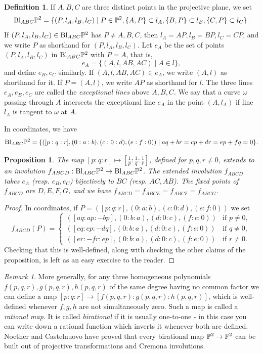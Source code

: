 \documentclass[letterpaper,11pt]{article}
\newtheorem{prop}{Proposition}
\theoremstyle{definition}
\newtheorem{defn}{Definition}
\theoremstyle{remark}
\newtheorem{rmk}{Remark}
\begin{document}
\begin{defn} If $A,B,C$ are three distinct points in the projective plane, we set
\[
\text{\rm Bl}_{ABC}\mathbb{P}^2 = \{(P,l_A,l_B,l_C)\mid P \in \mathbb{P}^2, \{A,P\} \subset l_A, \{B,P\} \subset l_B, \{C,P\} \subset l_C\}.
\]
If $(P,l_A,l_B,l_C) \in \text{\rm Bl}_{ABC}\mathbb{P}^2$ has $P \ne A,B,C$, then $l_A = AP, l_B = BP, l_C = CP$, and we write $P$ as shorthand for $(P,l_A,l_B,l_C)$. Let $e_A$ be the set of points $(P,l_A,l_B,l_C)$ in $\text{\rm Bl}_{ABC}\mathbb{P}^2$ with $P = A$, that is,
\[
e_A = \{(A,l,AB,AC) \mid A\in l\},
\]
and define $e_B, e_C$ similarly. If $(A,l,AB,AC)\in e_A$, we write $(A,l)$ as shorthand for it. If $P = (A,l)$, we write $AP$ as shorthand for $l$. The three lines $e_A, e_B, e_C$ are called the \emph{exceptional lines} above $A,B,C$. We say that a curve $\omega$ passing through $A$ intersects the exceptional line $e_A$ in the point $(A,l_A)$ if line $l_A$ is tangent to $\omega$ at $A$.
\end{defn}

In coordinates, we have
\[
\text{\rm Bl}_{ABC}\mathbb{P}^2 = \{([p:q:r],(0:a:b),(c:0:d),(e:f:0))\mid aq+br = cp+dr = ep+fq = 0\}.
\]

\begin{prop} The map $[p:q:r]\mapsto [\frac{1}{p}:\frac{1}{q}:\frac{1}{r}]$, defined for $p,q,r \ne 0$, extends to an involution $f_{ABCD} : \text{\rm Bl}_{ABC}\mathbb{P}^2 \rightarrow \text{\rm Bl}_{ABC}\mathbb{P}^2$. The extended involution $f_{ABCD}$ takes $e_A$ (resp. $e_B, e_C$) bijectively to $BC$ (resp. $AC, AB$). The fixed points of $f_{ABCD}$ are $D,E,F,G$, and we have $f_{ABCD} = f_{ABCE} = f_{ABCF} = f_{ABCG}$.
\end{prop}
\begin{proof} In coordinates, if $P = ([p:q:r],(0:a:b),(c:0:d),(e:f:0))$ we set
\[
f_{ABCD}(P) = \begin{cases}([aq:ap:-bp],(0:b:a),(d:0:c),(f:e:0)) & \mbox{if }p\ne 0,\\([cq:cp:-dq],(0:b:a),(d:0:c),(f:e:0)) & \mbox{if }q\ne 0,\\ ([er:-fr:ep],(0:b:a),(d:0:c),(f:e:0)) & \mbox{if }r\ne 0.\end{cases}
\]
Checking that this is well-defined, along with checking the other claims of the proposition, is left as an easy exercise to the reader.
\end{proof}

\begin{rmk} More generally, for any three homogeneous polynomials $f(p,q,r),g(p,q,r),h(p,q,r)$ of the same degree having no common factor we can define a map $[p:q:r] \rightarrow [f(p,q,r):g(p,q,r):h(p,q,r)]$, which is well-defined whenever $f,g,h$ are not simultaneously zero. Such a map is called a \emph{rational map}. It is called \emph{birational} if it is usually one-to-one - in this case you can write down a rational function which inverts it whenever both are defined. Noether and Castelnuovo have proved that every birational map $\mathbb{P}^2\rightarrow \mathbb{P}^2$ can be built out of projective transformations and Cremona involutions.
\end{rmk}
\end{document}
